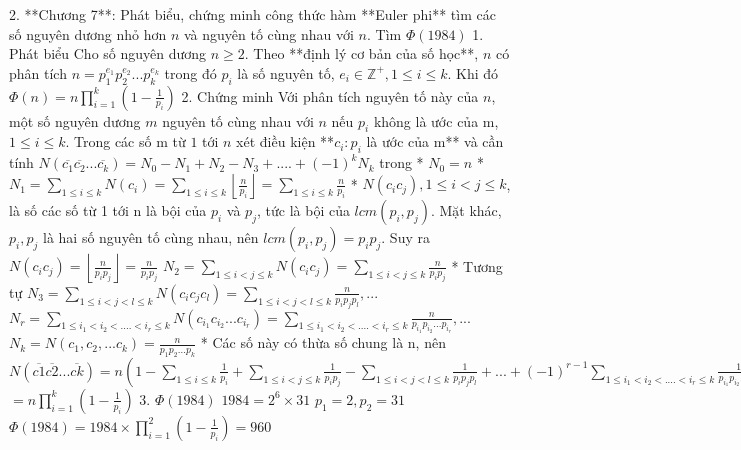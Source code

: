 2. **Chương 7**: Phát biểu, chứng minh công thức hàm **Euler phi** tìm các số nguyên dương nhỏ hơn $n$ và nguyên tố cùng nhau với $n$. Tìm $\Phi(1984)$
    1. Phát biểu
        Cho số nguyên dương $n \geq 2$. Theo **định lý cơ bản của số học**, $n$ có phân tích $n = p_1^{e_1}p_2^{e_2}...p_k^{e_k}$ trong đó $p_i$ là số nguyên tố, $e_i \in \mathbb{Z^+}, 1 \leq i \leq k$. Khi đó
        $\Phi(n) = n \displaystyle \prod_{i=1}^k(1-\frac{1}{p_i})$
    2. Chứng minh
        Với phân tích nguyên tố này của $n$, một số nguyên dương $m$ nguyên tố cùng nhau với $n$ nếu $p_i$ không là ước của m, $1 \leq i \leq k$. Trong các số m từ $1$ tới $n$ xét điều kiện 
        **$c_i:  p_i$ là ước của m** và cần tính
        $N(\overline{c_1} \overline{c_2} ... \overline{c_k})= N_0 - N_1+N_2-N_3+....+(-1)^k N_k$ trong 
        *  $N_0=n$
        *  $N_1=\displaystyle \sum_{1 \leq i\leq k} N(c_i) = \displaystyle \sum_{1 \leq i\leq k}\left\lfloor \frac{n}{p_i} \right\rfloor = \displaystyle \sum_{1 \leq i\leq k}\frac{n}{p_i}$
        *  $N(c_ic_j), 1 \leq i < j \leq k$, là số các số từ 1 tới n là bội của $p_i$ và $p_j$, tức là bội của $lcm(p_i,p_j)$. Mặt khác, $p_i, p_j$ là hai số nguyên tố cùng nhau, nên $lcm(p_i, p_j) = p_ip_j$. Suy ra $N(c_ic_j)=\left\lfloor \frac{n}{p_ip_j}\right\rfloor=\frac{n}{p_ip_j}$
        $N_2 = \displaystyle \sum_{1 \leq i < j\leq k} N(c_ic_j)=\displaystyle \sum_{1 \leq i < j\leq k}\frac{n}{p_ip_j}$
        * Tương tự
            $N_3 = \displaystyle \sum_{1 \leq i < j < l\leq k} N(c_ic_jc_l) = \displaystyle \sum_{1 \leq i < j < l\leq k}\frac{n}{p_ip_jp_l},...$
            $N_r = \displaystyle \sum_{1 \leq i_1 < i_2 < .... < i_r\leq k}N(c_{i_1}c_{i_2}...c_{i_r}) = \displaystyle \sum_{1 \leq i_1 < i_2 < .... < i_r\leq k}\frac{n}{p_{i_1}p_{i_2}...p_{i_r}},...$
            $N_k = N(c_1,c_2,...c_k)=\frac{n}{p_1p_2...p_k}$
        * Các số này có thừa số chung là n, nên
        $N(\overline{c1}\overline{c2}...\overline{ck}) = n(1 - \displaystyle \sum_{1 \leq i\leq k}\frac{1}{p_i} + \displaystyle \sum_{1 \leq i < j\leq k}\frac{1}{p_ip_j} - \displaystyle \sum_{1 \leq i < j < l\leq k}\frac{1}{p_ip_jp_l} +...+ (-1)^{r-1}\displaystyle \sum_{1 \leq i_1 < i_2 < .... < i_r\leq k}\frac{1}{p_{i_1}p_{i_2}...p_{i_r}} +(-1)^k\frac{1}{p_1p_2...p_k})$
        $=n\displaystyle\prod_{i=1}^{k}(1-\frac{1}{p_i})$
    3. $\Phi(1984)$
        $1984 = 2^6 \times 31$
        $p_1 = 2, p_2 = 31$
        $\Phi(1984) = 1984 \times \displaystyle \prod_{i=1}^{2}(1 - \frac{1}{p_i}) = 960$
        
